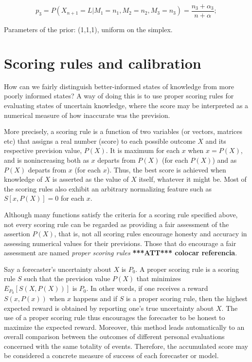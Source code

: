 \documentclass[journal,article,accept,moreauthors,pdftex,12pt,a4paper]{mdpi}
\newcommand{\red}[1]{\textbf{\color{red} ***ATT*** #1}}
\begin{document}
\[p_3=P(X_{n+1}=L|M_1=n_1,M_2=n_2,M_3=n_3)=\frac{n_3+\alpha_3}{n+\alpha};\]

Parameters of the prior: (1,1,1), uniform on the simplex.

\section{Scoring rules and calibration}
\label{sec::scoring}

How can we fairly distinguish better-informed states of knowledge from more poorly informed states?
A way of doing this is to use proper scoring rules for evaluating states of uncertain knowledge, where 
the score may be interpreted as a numerical measure of how inaccurate was the prevision.

More precisely, a scoring rule is a function of two variables (or vectors, matrices etc) that assigns a real number (score) to each possible outcome $X$ and its respective prevision value, $P(X)$.
It is maximum for each $x$ when $x=P(X)$, and is nonincreasing both as $x$ departs from $P(X)$ (for each $P(X)$) and as $P(X)$ departs from $x$ (for each $x$).
Thus, the best score is achieved when knowledge of $X$ is asserted as the value of $X$ itself, whatever it might be. Most of the scoring rules also exhibit an arbitrary normalizing feature such as $S[x,P(X)]=0$ for each $x$.

Although many functions satisfy the criteria for a scoring rule specified above, not every scoring rule can be regarded as providing a fair assessment of the assertion $P(X)$, that is, not all scoring rules encourage honesty and accuracy in assessing numerical values for their previsions.
Those that do encourage a fair assessment are named \emph{proper scoring rules} \red{colocar referencia}. 

Say a forecaster's uncertainty about $X$ is $P_0$. A proper scoring rule is a scoring rule $S$ such that the prevision value $P(X)$ that minimizes $E_{P_0}[S(X,P(X))]$ is $P_0$. 
In other words, if one receives a reward $S(x,P(x))$ when $x$ happens and if $S$ is a proper scoring rule, then the highest expected reward is obtained by reporting one's  true uncertainty about $X$.
The use of a proper scoring rule thus encourages the forecaster to be honest to maximize the expected reward.
Moreover, this method leads automatically to an overall comparison between the outcomes of different personal evaluations concerned with the same totality of events.
Therefore, the accumulated score may be considered a concrete measure of success of each forecaster or model.
\end{document}
